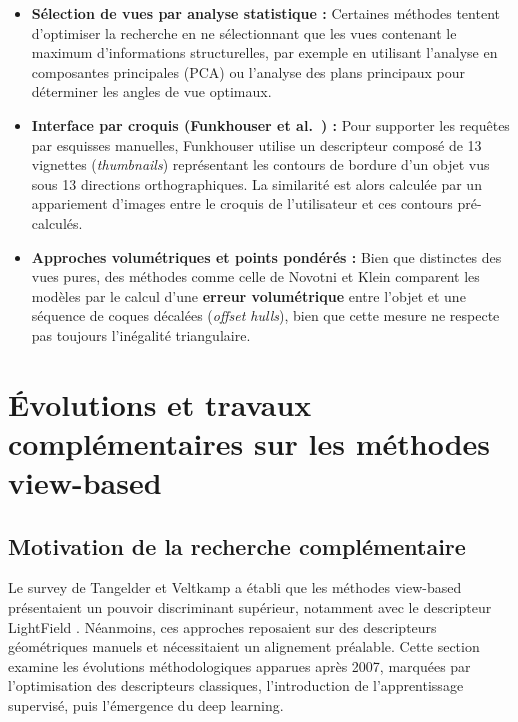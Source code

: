 \documentclass[11pt,a4paper,oneside]{report}
\begin{document}
\begin{itemize}
    \item \textbf{Sélection de vues par analyse statistique :} Certaines méthodes tentent d'optimiser la recherche en ne sélectionnant que les vues contenant le maximum d'informations structurelles, par exemple en utilisant l'analyse en composantes principales (PCA) ou l'analyse des plans principaux pour déterminer les angles de vue optimaux.
    \item \textbf{Interface par croquis (Funkhouser et al.~\cite{funkhouser42}) :} Pour supporter les requêtes par esquisses manuelles, Funkhouser utilise un descripteur composé de 13 vignettes (\textit{thumbnails}) représentant les contours de bordure d'un objet vus sous 13 directions orthographiques. La similarité est alors calculée par un appariement d'images entre le croquis de l'utilisateur et ces contours pré-calculés.
    \item \textbf{Approches volumétriques et points pondérés :} Bien que distinctes des vues pures, des méthodes comme celle de Novotni et Klein comparent les modèles par le calcul d'une \textbf{erreur volumétrique} entre l'objet et une séquence de coques décalées (\textit{offset hulls}), bien que cette mesure ne respecte pas toujours l'inégalité triangulaire.
\end{itemize}





\chapter{Évolutions et travaux complémentaires sur les méthodes view-based}

\section{Motivation de la recherche complémentaire}

Le survey de Tangelder et Veltkamp \cite{tangelder2007survey} a établi que les méthodes view-based présentaient un pouvoir discriminant supérieur, notamment avec le descripteur LightField \cite{chen2003visual}. Néanmoins, ces approches reposaient sur des descripteurs géométriques manuels et nécessitaient un alignement préalable. Cette section examine les évolutions méthodologiques apparues après 2007, marquées par l'optimisation des descripteurs classiques, l'introduction de l'apprentissage supervisé, puis l'émergence du deep learning.
\end{document}
